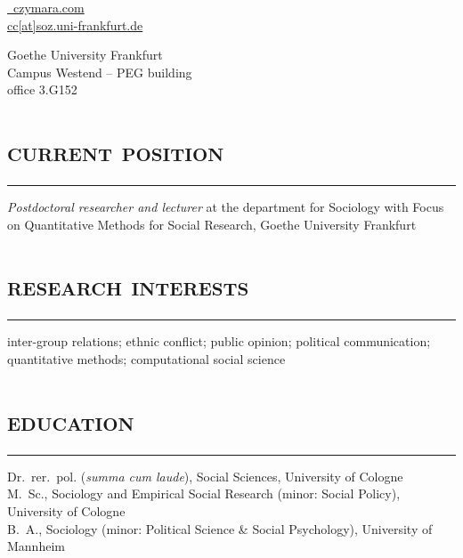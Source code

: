 \documentclass[11pt, a4paper]{article}
\title{}
\newcommand{\years}[1]{\marginnote{~~#1}}
\begin{document}
\author{\huge \textsc{Dr. Christian S. Czymara}}
\date{}
\maketitle
\begin{minipage}{0.5\textwidth}
\href{https://czymara.com}{\faLaptop~czymara.com}\\
\href{mailto:cc@soz.uni-frankfurt.de}{ cc[at]soz.uni-frankfurt.de}\\
\href{https://orcid.org/0000-0002-9535-3559}{\faOrcid}
\href{https://scholar.google.de/citations?user=khPqHmgAAAAJ}{\faGoogle}
\href{https://github.com/czymara/}{\faGithub}
\href{https://twitter.com/cczymara}{\faTwitter}
\end{minipage}
\begin{minipage}{0.5\textwidth}
\begin{flushright}
Goethe University Frankfurt\\
Campus Westend -- PEG building\\
office 3.G152
\end{flushright}
\end{minipage}
\section*{\textsc{current position}}
\vskip-20pt{\noindent\rule{\textwidth}{1pt}}
\years{since 05/18}\textit{Postdoctoral researcher and lecturer} at the department for Sociology with Focus on Quantitative Methods for Social Research, Goethe University Frankfurt
\section*{\textsc{research interests}}
\vskip-20pt{\noindent\rule{\textwidth}{1pt}}
inter-group relations; ethnic conflict; public opinion; political communication; quantitative methods; computational social science
\section*{\textsc{education}}
\vskip-20pt{\noindent\rule{\textwidth}{1pt}}
\noindent
\years{12/18}Dr.~rer.~pol. (\textit{summa cum laude}), Social Sciences, University of Cologne\\[1em]
\years{08/15}M.~Sc., Sociology and Empirical Social Research (minor: Social Policy), University of Cologne\\[1em]
\years{06/12}B.~A., Sociology (minor: Political Science \& Social Psychology), University of Mannheim
\end{document}
